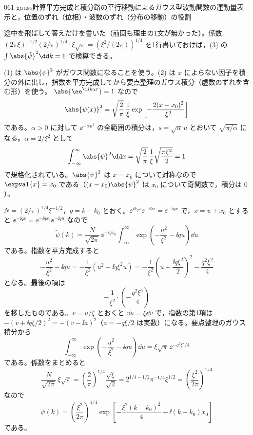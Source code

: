\documentclass[uplatex,dvipdfmx,a4paper,11pt]{jsarticle}
\begin{document}
\begin{mondai}{061-gauss}{計算}{平方完成と積分路の平行移動によるガウス型波動関数の運動量表示と，位置のずれ（位相）・波数のずれ（分布の移動）の役割}
\begin{kizuki}
\item {} 途中を飛ばして答えだけを書いた（前回も理由の1文が無かった）。係数 $(2\pi\xi)^{-1/2}(2/\pi)^{1/4}\cdot\xi\sqrt{\pi}=(\xi^{2}/(2\pi))^{1/4}$ を1行書いておけば，(3) の $\int\abs{\tilde{\psi}}^{2}\dd k=1$ で検算できる。
\end{kizuki}
\begin{tadashii}
\houshin (1) は $\abs{\psi}^{2}$ がガウス関数になることを使う。(2) は $x$ によらない因子を積分の外に出し，指数を平方完成してから要点整理のガウス積分（虚数のずれを含む形）を使う。
\keisan {} $\abs{\ee^{\ii k_{0}x}}=1$ なので
\[ \abs{\psi(x)}^{2}=\sqrt{\frac{2}{\pi}}\,\frac{1}{\xi}\exp\left[-\frac{2(x-x_{0})^{2}}{\xi^{2}}\right] \]
である。$\alpha>0$ に対して $\ee^{-\alpha u^{2}}$ の全範囲の積分は，$s=\sqrt{\alpha}\,u$ とおいて $\sqrt{\pi/\alpha}$ になる。$\alpha=2/\xi^{2}$ として
\[ \int_{-\infty}^{\infty}\abs{\psi}^{2}\dd x=\sqrt{\frac{2}{\pi}}\,\frac{1}{\xi}\sqrt{\frac{\pi\xi^{2}}{2}}=1 \]
で規格化されている。$\abs{\psi}^{2}$ は $x=x_{0}$ について対称なので $\expval{x}=x_{0}$ である（$(x-x_{0})\abs{\psi}^{2}$ は $x_{0}$ について奇関数で，積分は $0$）。

 $N=(2/\pi)^{1/4}\xi^{-1/2}$，$q=k-k_{0}$ とおく。$\ee^{\ii k_{0}x}\ee^{-\ii kx}=\ee^{-\ii qx}$ で，$x=u+x_{0}$ とすると $\ee^{-\ii qx}=\ee^{-\ii qx_{0}}\ee^{-\ii qu}$ なので
\[ \tilde{\psi}(k)=\frac{N}{\sqrt{2\pi}}\,\ee^{-\ii qx_{0}}\int_{-\infty}^{\infty}\exp\left(-\frac{u^{2}}{\xi^{2}}-\ii qu\right)\dd u \]
である。指数を平方完成すると
\[ -\frac{u^{2}}{\xi^{2}}-\ii qu=-\frac{1}{\xi^{2}}\left(u^{2}+\ii q\xi^{2}u\right)=-\frac{1}{\xi^{2}}\left(u+\frac{\ii q\xi^{2}}{2}\right)^{2}-\frac{q^{2}\xi^{2}}{4} \]
となる。最後の項は
\[ -\frac{1}{\xi^{2}}\cdot\left(-\frac{q^{2}\xi^{4}}{4}\right) \]
を移したものである。$v=u/\xi$ とおくと $\dd u=\xi\dd v$ で，指数の第1項は $-(v+\ii q\xi/2)^{2}=-(v-\ii a)^{2}$（$a=-q\xi/2$ は実数）になる。要点整理のガウス積分から
\[ \int_{-\infty}^{\infty}\exp\left(-\frac{u^{2}}{\xi^{2}}-\ii qu\right)\dd u=\xi\sqrt{\pi}\,\ee^{-q^{2}\xi^{2}/4} \]
である。係数をまとめると
\[ \frac{N}{\sqrt{2\pi}}\,\xi\sqrt{\pi}=\left(\frac{2}{\pi}\right)^{1/4}\frac{\sqrt{\xi}}{\sqrt{2}}=2^{1/4-1/2}\pi^{-1/4}\xi^{1/2}=\left(\frac{\xi^{2}}{2\pi}\right)^{1/4} \]
なので
\[ \tilde{\psi}(k)=\left(\frac{\xi^{2}}{2\pi}\right)^{1/4}\exp\left[-\frac{\xi^{2}(k-k_{0})^{2}}{4}-\ii(k-k_{0})x_{0}\right] \]
である。


\end{tadashii}
\end{mondai}
\end{document}
